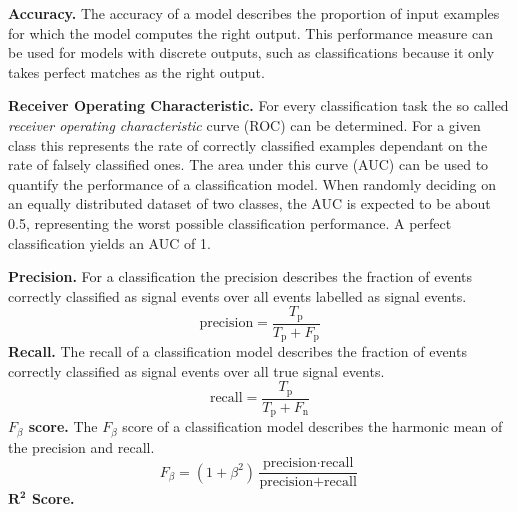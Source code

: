 \textbf{Accuracy.} The accuracy of a model describes the proportion of input
examples for which the model computes the right output. This performance
measure can be used for models with discrete outputs, such as classifications
because it only takes perfect matches as the right output.

\textbf{Receiver Operating Characteristic.} For every classification task the
so called \textit{receiver operating characteristic} curve (ROC) can be
determined. For a given class this represents the rate of correctly classified
examples dependant on the rate of falsely classified ones. The area under this
curve (AUC) can be used to quantify the performance of a classification model.
When randomly deciding on an equally distributed dataset of two classes, the
AUC is expected to be about \num{0.5}, representing the worst possible
classification performance. A perfect classification yields an AUC of \num{1}.

\textbf{Precision.} For a classification the precision describes the fraction
of events correctly classified as signal events over all events labelled as
signal events.
%
\begin{equation}
  \text{precision} = \frac{T_{\text{p}}}{T_{\text{p}} + F_{\text{p}}}
\end{equation}
%
\textbf{Recall.} The recall of a classification model describes the fraction
of events correctly classified as signal events over all true signal events.
%
\begin{equation}
  \text{recall} = \frac{T_{\text{p}}}{T_{\text{p}} + F_{\text{n}}}
\end{equation}
%
\textbf{$F_\beta$ score.} The $F_\beta$ score of a classification model describes the harmonic mean of the precision and recall.
%
\begin{equation}
  F_\beta = (1 + \beta^2)\frac{\text{precision} \cdot \text{recall}}{\text{precision} + \text{recall}}
\end{equation}
%
\textbf{$\symbf{R^2}$ Score.} \blindtext
